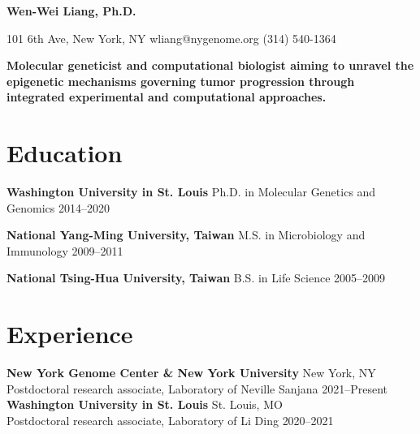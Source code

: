 \documentclass[letterpaper,11pt]{cv}
\begin{document}

\begin{minipage}[b][][c]{35em}
    \lightsourceserif\Huge\bfseries\color{color-title}
    Wen-Wei Liang, Ph.D.
\end{minipage}%
\hfill
\hspace{1em}
\begin{minipage}[b][][b]{11em}
    \raggedleft
    \small
    101 6th Ave, New York, NY \hfill
    {wliang@nygenome.org} \hfill
    (314) 540-1364
\end{minipage}

\vspace{2ex}

{
    \small\lightsourceserif\bfseries\color{color-title}
    Molecular geneticist and computational biologist aiming to unravel the epigenetic mechanisms governing tumor progression through integrated experimental and computational approaches.\par
}

\section{Education}

\begin{entrylist}

\item \textbf{Washington University in St. Louis} \hspace{2.45em} Ph.D. in Molecular Genetics and Genomics \hfill
    2014--2020

\item \textbf{National Yang-Ming University, Taiwan} \hspace{0.5em} M.S. in Microbiology and Immunology \hfill
    2009--2011

\item \textbf{National Tsing-Hua University, Taiwan} \hspace{0.72em} B.S. in Life Science \hfill
    2005--2009

\end{entrylist}

\section{Experience}
\textbf{New York Genome Center \& New York University}
\hfill New York, NY\\
Postdoctoral research associate, {Laboratory of Neville Sanjana } \hfill
2021--Present\\
\textbf{Washington University in St. Louis}
\hfill St. Louis, MO\\
Postdoctoral research associate, {Laboratory of Li Ding } \hfill
2020--2021
\end{document}
